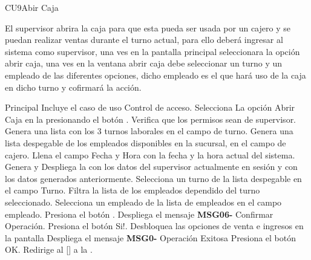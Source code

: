 \begin{UseCase}{CU9}{Abir Caja}{
		El supervisor abrira la caja para que esta pueda ser usada por un cajero y se puedan realizar ventas durante el turno actual, para ello deberá ingresar al sistema como supervisor, una ves en la pantalla principal seleccionara la opción abrir caja, una ves en la ventana abrir caja debe seleccionar un turno y un empleado de las diferentes opciones, dicho empleado es el que hará uso de la caja en dicho turno y cofirmará la acción.
		
	}
	\end{UseCase}
	\begin{UCtrayectoria}{Principal}
		\UCpaso Incluye el caso de uso  Control de acceso.
		\UCpaso [\UCactor] Selecciona La opción Abrir Caja en la  presionando el botón .
		\UCpaso Verifica que los permisos sean de supervisor. 
		\UCpaso Genera una lista con los 3 turnos laborales en el campo de turno.
		\UCpaso Genera una lista despegable de los empleados disponibles en la sucursal, en el campo de cajero.
		\UCpaso Llena el campo Fecha y Hora con la fecha y la hora actual del sistema. 
		\UCpaso Genera y Despliega la  con los datos del supervisor actualmente en sesión y con los datos generados anteriormente. 
		\UCpaso [\UCactor] Selecciona un turno de la lista despegable en el campo Turno. 
		\UCpaso Filtra la lista de los empleados dependido del turno seleccionado.
		\UCpaso [\UCactor] Selecciona un empleado de la lista de empleados en el campo empleado.
		\UCpaso [\UCactor] Presiona el botón . 
		\UCpaso Despliega el mensaje {\bf MSG06-} {Confirmar Operación}. 
		\UCpaso [\UCactor] Presiona el botón {Si!}. 
		\UCpaso Desbloquea las opciones de venta e ingresos en la pantalla 
		\UCpaso Despliega el mensaje {\bf MSG0-} {Operación Exitosa}
		\UCpaso [\UCactor] Presiona el botón {OK}.		
		\UCpaso Redirige al [\UCactor] a la .
	\end{UCtrayectoria}


